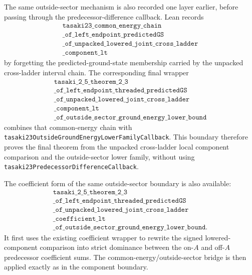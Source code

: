 \documentclass[a4paper,11pt]{article}
\begin{document}
The same outside-sector mechanism is also recorded one layer earlier,
before passing through the predecessor-difference callback.  Lean records
\[
\begin{gathered}
\texttt{tasaki23\_common\_energy\_chain}\\
\texttt{\_of\_left\_endpoint\_predictedGS}\\
\texttt{\_of\_unpacked\_lowered\_joint\_cross\_ladder}\\
\texttt{\_component\_lt}
\end{gathered}
\]
by forgetting the predicted-ground-state membership carried by the
unpacked cross-ladder interval chain.  The corresponding final wrapper
\[
\begin{gathered}
\texttt{tasaki\_2\_5\_theorem\_2\_3}\\
\texttt{\_of\_left\_endpoint\_threaded\_predictedGS}\\
\texttt{\_of\_unpacked\_lowered\_joint\_cross\_ladder}\\
\texttt{\_component\_lt}\\
\texttt{\_of\_outside\_sector\_ground\_energy\_lower\_bound}
\end{gathered}
\]
combines that common-energy chain with
\texttt{tasaki23OutsideGroundEnergyLowerFamilyCallback}.  This boundary
therefore proves the final theorem from the unpacked cross-ladder local
component comparison and the outside-sector lower family, without using
\texttt{tasaki23PredecessorDifferenceCallback}.

The coefficient form of the same outside-sector boundary is also available:
\[
\begin{gathered}
\texttt{tasaki\_2\_5\_theorem\_2\_3}\\
\texttt{\_of\_left\_endpoint\_threaded\_predictedGS}\\
\texttt{\_of\_unpacked\_lowered\_joint\_cross\_ladder}\\
\texttt{\_coefficient\_lt}\\
\texttt{\_of\_outside\_sector\_ground\_energy\_lower\_bound}.
\end{gathered}
\]
It first uses the existing coefficient wrapper to rewrite the signed
lowered-component comparison into strict dominance between the on-\(A\) and
off-\(A\) predecessor coefficient sums.  The common-energy/outside-sector
bridge is then applied exactly as in the component boundary.
\end{document}
